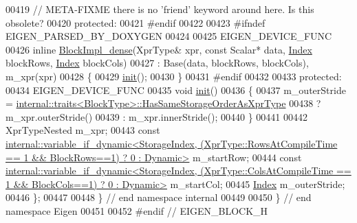 \begin{DoxyCode}
00419   \textcolor{comment}{// META-FIXME there is no 'friend' keyword around here. Is this obsolete?}
00420   \textcolor{keyword}{protected}:
00421 \textcolor{preprocessor}{  #endif}
00422 
00423 \textcolor{preprocessor}{    #ifndef EIGEN\_PARSED\_BY\_DOXYGEN}
00424 
00425     EIGEN\_DEVICE\_FUNC
00426     \textcolor{keyword}{inline} \hyperlink{class_eigen_1_1internal_1_1_block_impl__dense}{BlockImpl\_dense}(XprType& xpr, \textcolor{keyword}{const} Scalar* data, 
      \hyperlink{namespace_eigen_a62e77e0933482dafde8fe197d9a2cfde}{Index} blockRows, \hyperlink{namespace_eigen_a62e77e0933482dafde8fe197d9a2cfde}{Index} blockCols)
00427       : Base(data, blockRows, blockCols), m\_xpr(xpr)
00428     \{
00429       \hyperlink{structinit}{init}();
00430     \}
00431 \textcolor{preprocessor}{    #endif}
00432 
00433   \textcolor{keyword}{protected}:
00434     EIGEN\_DEVICE\_FUNC
00435     \textcolor{keywordtype}{void} \hyperlink{structinit}{init}()
00436     \{
00437       m\_outerStride = \hyperlink{struct_eigen_1_1internal_1_1traits}{internal::traits<BlockType>::HasSameStorageOrderAsXprType}
00438                     ? m\_xpr.outerStride()
00439                     : m\_xpr.innerStride();
00440     \}
00441 
00442     XprTypeNested m\_xpr;
00443     \textcolor{keyword}{const} 
      \hyperlink{class_eigen_1_1internal_1_1variable__if__dynamic}{internal::variable\_if\_dynamic<StorageIndex, (XprType::RowsAtCompileTime == 1 && BlockRows==1) ? 0 :
       Dynamic>}
       m\_startRow;
00444     \textcolor{keyword}{const} 
      \hyperlink{class_eigen_1_1internal_1_1variable__if__dynamic}{internal::variable\_if\_dynamic<StorageIndex, (XprType::ColsAtCompileTime == 1 && BlockCols==1) ? 0 :
       Dynamic>}
       m\_startCol;
00445     \hyperlink{namespace_eigen_a62e77e0933482dafde8fe197d9a2cfde}{Index} m\_outerStride;
00446 \};
00447 
00448 \} \textcolor{comment}{// end namespace internal}
00449 
00450 \} \textcolor{comment}{// end namespace Eigen}
00451 
00452 \textcolor{preprocessor}{#endif // EIGEN\_BLOCK\_H}
\end{DoxyCode}
